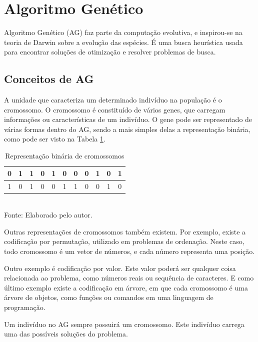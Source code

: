 \documentclass[
	12pt,					%
	openright,				%
	oneside,				%
	a4paper,				%
	bibjustif,				%
	chapter=TITLE,			%
	english,				%
	brazil,					%
	]{abntex2}
\newcommand{\source}[1]{\small Fonte: {#1}}
\begin{document}
	\FloatBarrier
	\section{Algoritmo Genético}
	Algoritmo Genético (AG) faz parte da computação evolutiva,
	e inspirou-se na teoria de Darwin sobre a evolução das espécies.
	É uma busca heurística usada para encontrar soluções de otimização e resolver problemas de busca.
	
	\FloatBarrier
	\subsection{Conceitos de AG}
	A unidade que caracteriza um determinado indivíduo na população é o cromossomo.
	O cromossomo é constituído de vários genes,
	que carregam informações ou características de um indivíduo. %
	O gene pode ser representado de várias formas dentro do AG,
	sendo a mais simples delas a representação binária,
	como pode ser visto na Tabela \ref{tab:cromosome}.
	
	\begin{table}[ht]
		\caption{Representação binária de cromossomos}
		\centering
		\begin{tabular}{c c c c c c c c c c c}
			\hline 
			0 & 1 & 1 & 0 & 1 & 0 & 0 & 0 & 1 & 0 & 1\\ 
			\hline 
			1 & 0 & 1 & 0 & 0 & 1 & 1 & 0 & 0 & 1 & 0\\ 
			\hline 
		\end{tabular} \\
		\vspace{3mm}
		\source{Elaborado pelo autor.}
		\label{tab:cromosome}
	\end{table}
	
	Outras representações de cromossomos também existem.
	Por exemplo, existe a codificação por permutação,
	utilizado em problemas de ordenação.
	Neste caso, todo cromossomo é um vetor de números,
	e cada número representa uma posição.
	
	Outro exemplo é codificação por valor.
	Este valor poderá ser qualquer coisa relacionada ao problema,
	como números reais ou sequência de caracteres.
	E como último exemplo existe a codificação em árvore,
	em que cada cromossomo é uma árvore de objetos,
	como funções ou comandos em uma linguagem de programação.
	
	Um indivíduo no AG sempre possuirá um cromossomo.
	Este indivíduo carrega uma das possíveis soluções do problema.
	
\end{document}
